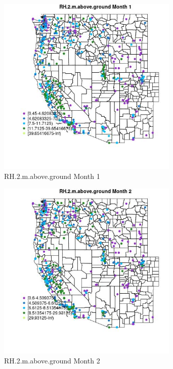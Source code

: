 \begin{figure} 
\centering  
\includegraphics[width=0.77\textwidth]{Code_Outputs/ML_input_report_ML_input_PM25_Step5_part_d_de_duplicated_aves_ML_input_MapObsMo1RH2maboveground.jpg} 
\caption{\label{fig:ML_input_report_ML_input_PM25_Step5_part_d_de_duplicated_aves_ML_inputMapObsMo1RH2maboveground}RH.2.m.above.ground Month 1} 
\end{figure} 
 

\begin{figure} 
\centering  
\includegraphics[width=0.77\textwidth]{Code_Outputs/ML_input_report_ML_input_PM25_Step5_part_d_de_duplicated_aves_ML_input_MapObsMo2RH2maboveground.jpg} 
\caption{\label{fig:ML_input_report_ML_input_PM25_Step5_part_d_de_duplicated_aves_ML_inputMapObsMo2RH2maboveground}RH.2.m.above.ground Month 2} 
\end{figure} 
 

